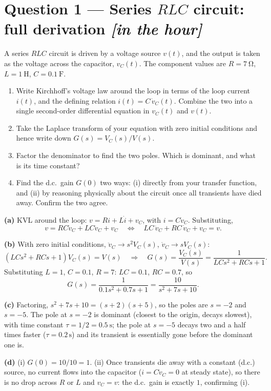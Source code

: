 \documentclass[11pt,a4paper]{article}
\newcommand{\inhour}{\hfill{\small\color{faccent}\itshape[in the hour]}}
\begin{document}
\section*{Question 1 --- Series $RLC$ circuit: full derivation \inhour}

A series $RLC$ circuit is driven by a voltage source $v(t)$, and the output is
taken as the voltage across the capacitor, $v_C(t)$. The component values are
$R=\SI{7}{\ohm}$, $L=\SI{1}{\henry}$, $C=\SI{0.1}{\farad}$.

\begin{enumerate}[label=(\alph*)]
\item Write Kirchhoff's voltage law around the loop in terms of the loop
      current $i(t)$, and the defining relation $i(t)=C\,\dot v_C(t)$. Combine
      the two into a single second-order differential equation in $v_C(t)$
      and $v(t)$.
\item Take the Laplace transform of your equation with zero initial
      conditions and hence write down $G(s)=V_C(s)/V(s)$.
\item Factor the denominator to find the two poles. Which is dominant, and
      what is its time constant?
\item Find the d.c.\ gain $G(0)$ two ways: (i) directly from your transfer
      function, and (ii) by reasoning physically about the circuit once all
      transients have died away. Confirm the two agree.
\end{enumerate}

\begin{solution}
\textbf{(a)} KVL around the loop: $v = Ri + L\dot i + v_C$, with
$i=C\dot v_C$. Substituting,
\[
  v = RC\dot v_C + LC\ddot v_C + v_C
  \quad\Longleftrightarrow\quad
  LC\,\ddot v_C + RC\,\dot v_C + v_C = v .
\]

\medskip
\textbf{(b)} With zero initial conditions, $\ddot v_C\to s^2V_C(s)$,
$\dot v_C\to sV_C(s)$:
\[
  (LCs^2+RCs+1)V_C(s) = V(s)
  \quad\Longrightarrow\quad
  G(s)=\frac{V_C(s)}{V(s)}=\frac{1}{LCs^2+RCs+1}.
\]
Substituting $L=1$, $C=0.1$, $R=7$: $LC=0.1$, $RC=0.7$, so
\[
  G(s)=\frac{1}{0.1s^2+0.7s+1}=\frac{10}{s^2+7s+10}.
\]

\medskip
\textbf{(c)} Factoring, $s^2+7s+10=(s+2)(s+5)$, so the poles are
$s=-2$ and $s=-5$. The pole at $s=-2$ is dominant (closest to the origin,
decays slowest), with time constant $\tau=1/2=\SI{0.5}{\second}$; the pole
at $s=-5$ decays two and a half times faster ($\tau=0.2\,\si{\second}$) and
its transient is essentially gone before the dominant one is.

\medskip
\textbf{(d)} (i) $G(0)=10/10=1$. (ii) Once transients die away with a
constant (d.c.) source, no current flows into the capacitor
($i=C\dot v_C=0$ at steady state), so there is no drop across $R$ or $L$ and
$v_C=v$: the d.c.\ gain is exactly $1$, confirming (i).
\end{solution}
\end{document}
